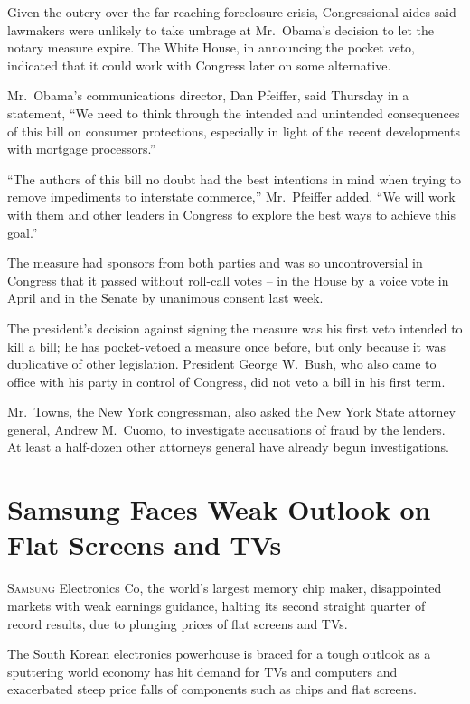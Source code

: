 ﻿\documentclass[12pt]{article}
\begin{document}
Given the outcry over the far-reaching foreclosure crisis, Congressional aides said lawmakers were
unlikely to take umbrage at Mr.~Obama's decision to let the notary measure expire. The White House,
in announcing the pocket veto, indicated that it could work with Congress later on some alternative.

Mr.~Obama's communications director, Dan Pfeiffer, said Thursday in a statement, ``We need to think
through the intended and unintended consequences of this bill on consumer protections, especially in
light of the recent developments with mortgage processors.''

``The authors of this bill no doubt had the best intentions in mind when trying to remove
impediments to interstate commerce,'' Mr.~Pfeiffer added. ``We will work with them and other leaders
in Congress to explore the best ways to achieve this goal.''

The measure had sponsors from both parties and was so uncontroversial in Congress that it passed
without roll-call votes -- in the House by a voice vote in April and in the Senate by unanimous
consent last week.

The president's decision against signing the measure was his first veto intended to kill a bill; he
has pocket-vetoed a measure once before, but only because it was duplicative of other legislation.
President George W.~Bush, who also came to office with his party in control of Congress, did not
veto a bill in his first term.

Mr.~Towns, the New York congressman, also asked the New York State attorney general, Andrew
M.~Cuomo, to investigate accusations of fraud by the lenders. At least a half-dozen other attorneys
general have already begun investigations.

\section{Samsung Faces Weak Outlook on Flat Screens and TVs}

\lettrine{S}{amsung} Electronics Co, the world's largest memory chip maker,
disappointed markets with weak earnings guidance, halting its second straight quarter of record
results, due to plunging prices of flat screens and TVs.

The South Korean electronics powerhouse is braced for a tough outlook as a sputtering world economy
has hit demand for TVs and computers and exacerbated steep price falls of components such as chips
and flat screens.
\end{document}

